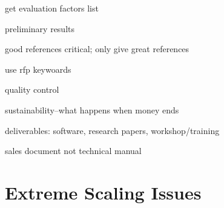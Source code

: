 \documentclass{article}
\begin{document}
get evaluation factors list

preliminary results

good references critical; only give great references

use rfp keywoards

quality control

sustainability--what happens when money ends

deliverables: software, research papers, workshop/training

sales document not technical manual


\section{Extreme Scaling Issues} \label{s:scaling}
\end{document}
